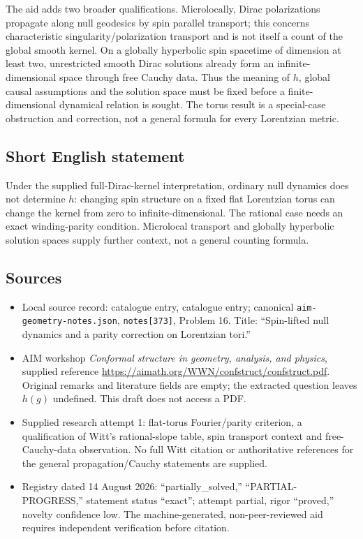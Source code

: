 \documentclass[11pt]{article}
\begin{document}
The aid adds two broader qualifications. Microlocally, Dirac polarizations propagate along null geodesics by spin parallel transport; this concerns characteristic singularity/polarization transport and is not itself a count of the global smooth kernel. On a globally hyperbolic spin spacetime of dimension at least two, unrestricted smooth Dirac solutions already form an infinite-dimensional space through free Cauchy data. Thus the meaning of \(h\), global causal assumptions and the solution space must be fixed before a finite-dimensional dynamical relation is sought. The torus result is a special-case obstruction and correction, not a general formula for every Lorentzian metric.
\subsection{Short English statement}
Under the supplied full-Dirac-kernel interpretation, ordinary null dynamics does not determine \(h\): changing spin structure on a fixed flat Lorentzian torus can change the kernel from zero to infinite-dimensional. The rational case needs an exact winding-parity condition. Microlocal transport and globally hyperbolic solution spaces supply further context, not a general counting formula.
\subsection{Sources}
\begin{itemize}
\item Local source record: catalogue entry, catalogue entry; canonical \texttt{aim-geometry-notes.json}, \texttt{notes[373]}, Problem 16. Title: ``Spin-lifted null dynamics and a parity correction on Lorentzian tori.''
\item AIM workshop \emph{Conformal structure in geometry, analysis, and physics}, supplied reference \url{https://aimath.org/WWN/confstruct/confstruct.pdf}. Original remarks and literature fields are empty; the extracted question leaves \(h(g)\) undefined. This draft does not access a PDF.
\item Supplied research attempt 1: flat-torus Fourier/parity criterion, a qualification of Witt's rational-slope table, spin transport context and free-Cauchy-data observation. No full Witt citation or authoritative references for the general propagation/Cauchy statements are supplied.
\item Registry dated 14 August 2026: ``partially\_solved,'' ``PARTIAL-PROGRESS,'' statement status ``exact''; attempt partial, rigor ``proved,'' novelty confidence low. The machine-generated, non-peer-reviewed aid requires independent verification before citation.
\end{itemize}
\end{document}
